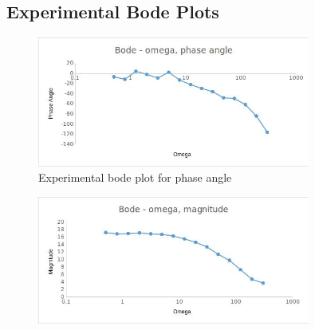 \subsection{Experimental Bode Plots}

\begin{figure}[H]
	\centering
	\includegraphics[width=0.8\textwidth]{./figures/lab2_experiment_phase.jpg}
	\caption{Experimental bode plot for phase angle}
	\label{fig:}
\end{figure}

\begin{figure}[H]
	\centering
	\includegraphics[width=0.8\textwidth]{./figures/lab2_experiment_magnitude.jpg}
	\caption{}
	\label{fig:}
\end{figure}
